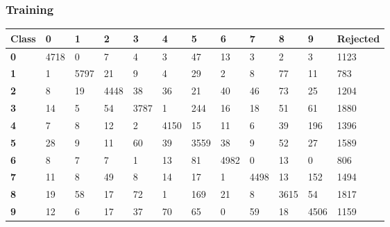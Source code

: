 \documentclass[
  a4paper,            %
  DIV=10,             %
  oneside,            %
  BCOR=5mm,           %
  parskip=half,       %
  numbers=noenddot,   %
  bibtotoc,           %
  listof=totoc,        %
  article
]{scrreprt}
\begin{document}
\subsubsection{Training}
\begin{center}
  \begin{tabular}{|p{1cm}|p{1cm}|p{1cm}|p{1cm}|p{1cm}|p{1cm}|p{1cm}|p{1cm}|p{1cm}|p{1cm}|p{1cm}|p{1.7cm}|}
    \hline
    \textbf{Class} & \textbf{0} & \textbf{1} & \textbf{2} & \textbf{3} & \textbf{4} & \textbf{5} & \textbf{6} & \textbf{7} & \textbf{8} & \textbf{9} & \textbf{Rejected} \\
    \hline
    \textbf{0} & 4718 & 0 & 7 & 4 & 3 & 47 & 13 & 3 & 2 & 3 & 1123 \\
    \hline
    \textbf{1} & 1 & 5797 & 21 & 9 & 4 & 29 & 2 & 8 & 77 & 11 & 783 \\
    \hline
    \textbf{2} & 8 & 19 & 4448 & 38 & 36 & 21 & 40 & 46 & 73 & 25 & 1204 \\
    \hline
    \textbf{3} & 14 & 5 & 54 & 3787 & 1 & 244 & 16 & 18 & 51 & 61 & 1880 \\
    \hline
    \textbf{4} & 7 & 8 & 12 & 2 & 4150 & 15 & 11 & 6 & 39 & 196 & 1396 \\
    \hline
    \textbf{5} & 28 & 9 & 11 & 60 & 39 & 3559 & 38 & 9 & 52 & 27 & 1589 \\
    \hline
    \textbf{6} & 8 & 7 & 7 & 1 & 13 & 81 & 4982 & 0 & 13 & 0 & 806 \\
    \hline
    \textbf{7} & 11 & 8 & 49 & 8 & 14 & 17 & 1 & 4498 & 13 & 152 & 1494 \\
    \hline
    \textbf{8} & 19 & 58 & 17 & 72 & 1 & 169 & 21 & 8 & 3615 & 54 & 1817 \\
    \hline
    \textbf{9} & 12 & 6 & 17 & 37 & 70 & 65 & 0 & 59 & 18 & 4506 & 1159 \\
    \hline
  \end{tabular}
\end{center}
\end{document}
